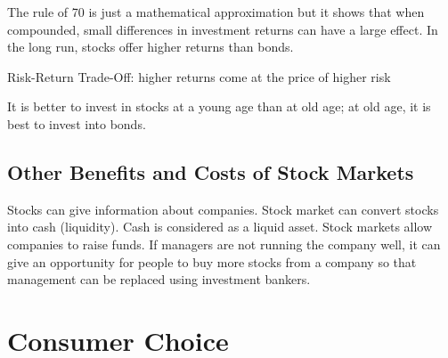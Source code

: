 \documentclass[12pt]{article}
\begin{document}
The rule of 70 is just a mathematical approximation but it shows that when compounded, small differences in investment returns can have a large effect. In the long run, stocks offer higher returns than bonds. 
\begin{definition} Risk-Return Trade-Off: higher returns come at the price of higher risk \end{definition}
It is better to invest in stocks at a young age than at old age; at old age, it is best to invest into bonds. 

\subsection{Other Benefits and Costs of Stock Markets}
Stocks can give information about companies. Stock market can convert stocks into cash (liquidity). Cash is considered as a liquid asset. Stock markets allow companies to raise funds. If managers are not running the company well, it can give an opportunity for people to buy more stocks from a company so that management can be replaced using investment bankers. 


\section{Consumer Choice}
\end{document}
